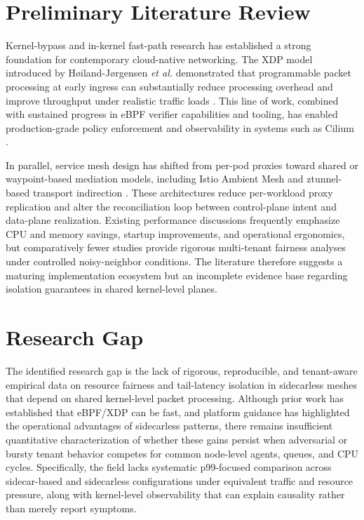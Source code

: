 \documentclass[12pt,a4paper]{article}
\begin{document}
\section{Preliminary Literature Review}
Kernel-bypass and in-kernel fast-path research has established a strong foundation for contemporary cloud-native networking. The XDP model introduced by H\o iland-J\o rgensen \textit{et al.} demonstrated that programmable packet processing at early ingress can substantially reduce processing overhead and improve throughput under realistic traffic loads \cite{xdp2018}. This line of work, combined with sustained progress in eBPF verifier capabilities and tooling, has enabled production-grade policy enforcement and observability in systems such as Cilium \cite{ciliumArchitecture,ciliumHubble}.

In parallel, service mesh design has shifted from per-pod proxies toward shared or waypoint-based mediation models, including Istio Ambient Mesh and ztunnel-based transport indirection \cite{istioAmbient,ambientDesign}. These architectures reduce per-workload proxy replication and alter the reconciliation loop between control-plane intent and data-plane realization. Existing performance discussions frequently emphasize CPU and memory savings, startup improvements, and operational ergonomics, but comparatively fewer studies provide rigorous multi-tenant fairness analyses under controlled noisy-neighbor conditions. The literature therefore suggests a maturing implementation ecosystem but an incomplete evidence base regarding isolation guarantees in shared kernel-level planes.

\section{Research Gap}
The identified research gap is the lack of rigorous, reproducible, and tenant-aware empirical data on resource fairness and tail-latency isolation in sidecarless meshes that depend on shared kernel-level packet processing. Although prior work has established that eBPF/XDP can be fast, and platform guidance has highlighted the operational advantages of sidecarless patterns, there remains insufficient quantitative characterization of whether these gains persist when adversarial or bursty tenant behavior competes for common node-level agents, queues, and CPU cycles. Specifically, the field lacks systematic p99-focused comparison across sidecar-based and sidecarless configurations under equivalent traffic and resource pressure, along with kernel-level observability that can explain causality rather than merely report symptoms.
\end{document}
